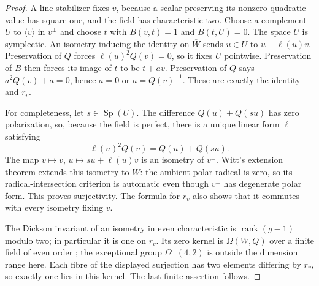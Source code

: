 \begin{proof}
A line stabilizer fixes $v$, because a scalar preserving its nonzero
quadratic value has square one, and the field has characteristic two.
Choose a complement $U$ to $\langle v\rangle$ in $v^\perp$ and choose
$t$ with $B(v,t)=1$ and $B(t,U)=0$.  The space $U$ is symplectic.  An
isometry inducing the identity on $\overline W$ sends
$u\in U$ to $u+\ell(u)v$.  Preservation of $Q$ forces $\ell(u)^2Q(v)=0$,
so it fixes $U$ pointwise.  Preservation of $B$ then forces its image
of $t$ to be $t+av$.  Preservation of $Q$ says
$a^2Q(v)+a=0$, hence $a=0$ or $a=Q(v)^{-1}$.  These are exactly the
identity and $r_v$.

For completeness, let $s\in\operatorname{Sp}(U)$.  The difference
$Q(u)+Q(su)$ has zero polarization, so, because the field is perfect,
there is a unique linear form $\ell$ satisfying
\[
 \ell(u)^2Q(v)=Q(u)+Q(su).
\]
The map $v\mapsto v$, $u\mapsto su+\ell(u)v$ is an isometry of
$v^\perp$.  Witt's extension theorem \cite[Theorem~7.4, pp.~57--58]{Taylor1992}
extends this isometry to $W$: the ambient polar radical is zero, so its
radical-intersection criterion is automatic even though $v^\perp$ has
degenerate polar form.
This proves surjectivity.  The formula for $r_v$ also shows that it
commutes with every isometry fixing $v$.

The Dickson invariant of an isometry in even characteristic is
$\operatorname{rank}(g-1)$ modulo two; in particular it is one on
$r_v$.  Its zero kernel is $\Omega(W,Q)$ over a finite field of even
order \cite[Theorems~11.43 and~11.51, pp.~160, 164--165]{Taylor1992};
the exceptional group $\Omega^+(4,2)$ is outside the dimension range here.  Each fibre of the displayed surjection has two elements
differing by $r_v$, so exactly one lies in this kernel.  The last
finite assertion follows.


\end{proof}
